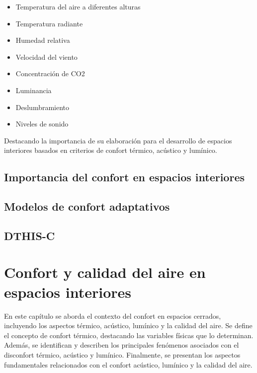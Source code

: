\documentclass[
  letterpaper,
]{scrbook}
\providecommand{\tightlist}{%
  \setlength{\itemsep}{0pt}\setlength{\parskip}{0pt}}\usepackage{longtable,booktabs,array}
\begin{document}
\begin{itemize}
\tightlist
\item
  Temperatura del aire a diferentes alturas
\item
  Temperatura radiante
\item
  Humedad relativa
\item
  Velocidad del viento
\item
  Concentración de CO2
\item
  Luminancia
\item
  Deslumbramiento
\item
  Niveles de sonido
\end{itemize}

Destacando la importancia de su elaboración para el desarrollo de
espacios interiores basados en criterios de confort térmico, acústico y
lumínico.

\section{Importancia del confort en espacios
interiores}\label{importancia-del-confort-en-espacios-interiores}

\section{Modelos de confort
adaptativos}\label{modelos-de-confort-adaptativos}

\section{DTHIS-C}\label{dthis-c}


\chapter{Confort y calidad del aire en espacios
interiores}\label{confort-y-calidad-del-aire-en-espacios-interiores}

En este capítulo se aborda el contexto del confort en espacios cerrados,
incluyendo los aspectos térmico, acústico, lumínico y la calidad del
aire. Se define el concepto de confort térmico, destacando las variables
físicas que lo determinan. Además, se identifican y describen los
principales fenómenos asociados con el disconfort térmico, acústico y
lumínico. Finalmente, se presentan los aspectos fundamentales
relacionados con el confort acústico, lumínico y la calidad del aire.
\end{document}
